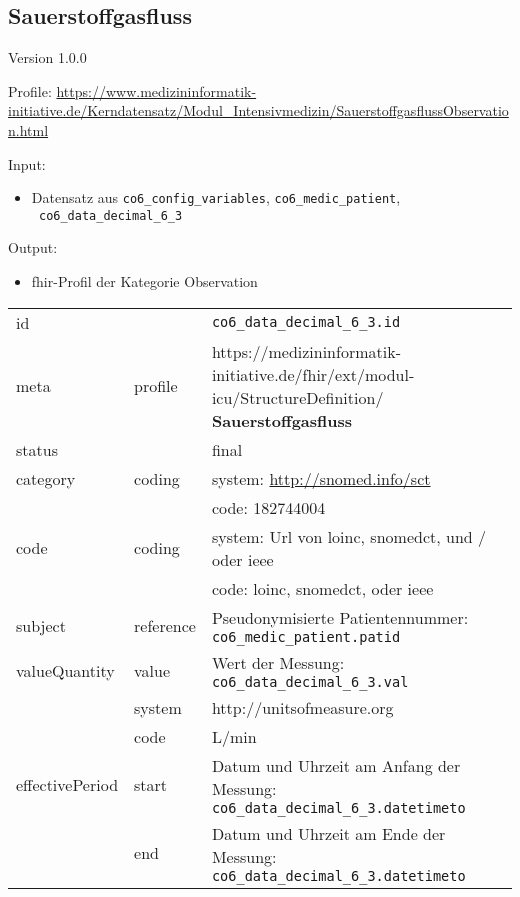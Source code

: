 \subsection{Sauerstoffgasfluss} 
\noindent Version 1.0.0

\noindent Profile: \url{https://www.medizininformatik-initiative.de/Kerndatensatz/Modul_Intensivmedizin/SauerstoffgasflussObservation.html}

\noindent Input:
\begin{itemize}
	\item Datensatz aus \texttt{co6\_config\_variables}, \texttt{co6\_medic\_patient}, \\ \texttt{
co6\_data\_decimal\_6\_3}
\end{itemize}
Output:
\begin{itemize}
        \item \ac{fhir}-Profil der Kategorie \glqq Observation\grqq{}
\end{itemize}
\begin{longtable}{|l|l|p{7.5cm}|}
        \hline
        \rowcolor{lightgray} \multicolumn{3}{|l|}{Data Mapping (inhaltlich)} \\ \hline
        id &  & \texttt{co6\_data\_decimal\_6\_3.id} \\ \hline
	meta & profile & https://medizininformatik-initiative.de/fhir/ext/modul-icu/StructureDefinition/\textbf{
Sauerstoffgasfluss} \\ \hline 
	status &  & final  \\ \hline 
	category & coding & system: \url{http://snomed.info/sct} \\
\cline{3-3}
	& & code: 182744004 \\ \hline
	code & coding & system: Url von \ac{loinc}, \ac{snomedct}, und / oder \ac{ieee} \\ 
	\cline{3-3} 
	 &  & code: \ac{loinc}, \ac{snomedct}, oder \ac{ieee} \\ \hline
	subject & reference & Pseudonymisierte Patientennummer: \texttt{co6\_medic\_patient.patid} \\ \hline
	valueQuantity & value & Wert der Messung: \texttt{
co6\_data\_decimal\_6\_3.val} \\
        \cline{2-3}
         & system & http://unitsofmeasure.org \\
         \cline{2-3}
         & code & L/min \\ \hline
    effectivePeriod & start & Datum und Uhrzeit am Anfang der Messung: \texttt{
co6\_data\_decimal\_6\_3.datetimeto} \\
    \cline{2-3}
     & end & Datum und Uhrzeit am Ende der Messung: \texttt{
co6\_data\_decimal\_6\_3.datetimeto} \\ \hline
\end{longtable}


